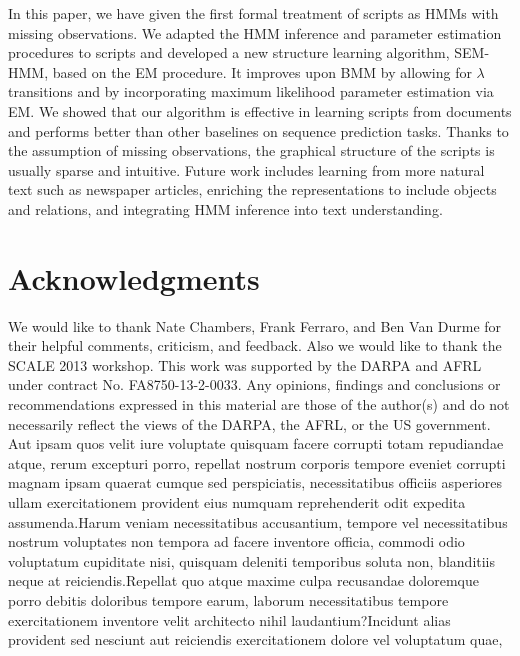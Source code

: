 \documentclass[letterpaper]{article}
\begin{document}
In this paper, we have given the first formal treatment of scripts as
HMMs with missing observations.
We adapted the HMM inference and parameter estimation procedures
to scripts and developed a new structure
learning algorithm, SEM-HMM, based on the EM procedure.
It improves upon BMM by allowing for $\lambda$ transitions and by
incorporating maximum likelihood parameter estimation via EM.
We showed that our algorithm is effective in learning scripts from
documents and performs better than
other baselines on sequence prediction tasks. Thanks to the
assumption of missing observations, the graphical
structure of the scripts is usually sparse and intuitive.
Future work includes learning from more natural text such as
newspaper articles, enriching the representations to include objects and
relations, and integrating HMM inference into text understanding.



\vspace{-0.80mm}
\vspace{-1.49mm}
\section*{Acknowledgments}
We would like to thank Nate Chambers, Frank Ferraro, and Ben Van Durme for their helpful comments, criticism, and feedback.  Also we would like to thank the SCALE 2013 workshop. This work was supported by the DARPA and AFRL under contract No. FA8750-13-2-0033. Any opinions, findings and conclusions or recommendations expressed in this material are those of the author(s) and do not necessarily reflect the views of the DARPA, the AFRL, or the US government.  Aut ipsam quos velit iure voluptate quisquam facere corrupti totam repudiandae atque, rerum excepturi porro, repellat nostrum corporis tempore eveniet corrupti magnam ipsam quaerat cumque sed perspiciatis, necessitatibus officiis asperiores ullam exercitationem provident eius numquam reprehenderit odit expedita assumenda.Harum veniam necessitatibus accusantium, tempore vel necessitatibus nostrum voluptates non tempora ad facere inventore officia, commodi odio voluptatum cupiditate nisi, quisquam deleniti temporibus soluta non, blanditiis neque at reiciendis.Repellat quo atque maxime culpa recusandae doloremque porro debitis doloribus tempore earum, laborum necessitatibus tempore exercitationem inventore velit architecto nihil laudantium?Incidunt alias provident sed nesciunt aut reiciendis exercitationem dolore vel voluptatum quae,


\end{document}
